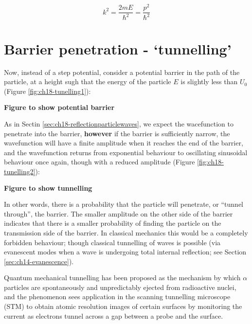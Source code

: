 \documentclass[
]{book}
\begin{document}
\begin{equation}
k^2 = \frac{2mE}{\hbar^2} = \frac{p^2}{\hbar^2}
\end{equation}

\hypertarget{sec:ch18-tunnelling1}{%
\section{Barrier penetration - `tunnelling'}\label{sec:ch18-tunnelling1}}

Now, instead of a step potential, consider a potential barrier in the path of the particle, at a height sugh that the energy of the particle \(E\) is slightly less than \(U_0\) (Figure \ref{fig:ch18-tunelling1}):

\textbf{Figure to show potential barrier}
\label{fig:ch18-tunelling1}

As in Sectin \ref{sec:ch18-reflectionparticlewaves}, we expect the wacefunction to penetrate into the barrier, \textbf{however} if the barrier is sufficiently narrow, the wavefunction will have a finite amplitude when it reaches the end of the barrier, and the wavefunction returns from exponential behaviour to oscillating sinusoidal behaviour once again, though with a reduced amplitude (Figure \ref{fig:ch18-tunelling2}):

\textbf{Figure to show tunnelling}
\label{fig:ch18-tunelling2}

In other words, there is a probability that the particle will penetrate, or ``tunnel through'', the barrier. The smaller amplitude on the other side of the barrier indicates that there is a smaller probability of finding the particle on the transmission side of the barrier. In classical mechanics this would be a completely forbidden behaviour; though classical tunnelling of waves is possible (via evanescent modes when a wave is undergoing total internal reflection; see Section \ref{sec:ch14-evanescence}).

Quantum mechanical tunnelling has been proposed as the mechanism by which \(\alpha\) particles are spontaneously and unpredictably ejected from radioactive nuclei, and the phenomenon sees application in the scanning tunnelling microscope (STM) to obtain atomic resolution images of certain surfaces by monitoring the current as electrons tunnel across a gap between a probe and the surface.

  
\end{document}

